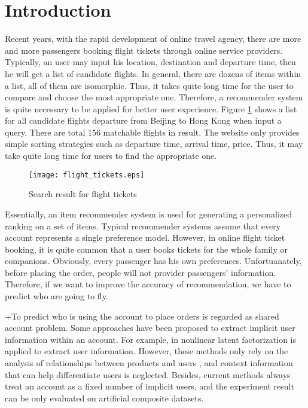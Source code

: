 \documentclass{llncs}
\begin{document}
\section{Introduction}
\label{sec:intro}
Recent years, with the rapid development of online travel agency, there are more and more passengers booking flight tickets through online service providers. Typically, an user may input his location, destination and departure time, then he will get a list of candidate flights. In general, there are dozens of items within a list, all of them are isomorphic. Thus, it takes quite long time for the user to compare and choose the most appropriate one. Therefore, a recommender system is quite necessary to be applied for better user experience. Figure \ref{fig:res} shows a list for all candidate flights departure from Beijing to Hong Kong when input a query. There are total 156 matchable flights in result. The website only provides simple sorting strategies such as departure time, arrival time, price. Thus, it may take quite long time for users to find the appropriate one.
\begin{figure}[!hbt]
\centering
\texttt{[image: flight\_tickets.eps]}
\caption{Search result for flight tickets}
\label{fig:res}
\end{figure}\par
Essentially, an item recommender system is used for generating a personalized ranking on a set of items\cite{lv:rec}. Typical recommender systems assume that every account represents a single preference model. However, in online flight ticket booking, it is quite common that a user books tickets for the whole family or companions.  Obviously, every passenger has his own preferences. Unfortuanately, before placing the order, people will not provider passengers' information.  Therefore, if we want to improve the accuracy of recommendation, we have to predict who are going to fly.  \par
 +To predict who is using the account to place orders is regarded as shared account problem. Some approaches have been proposed to extract implicit user information within an account. For example,  in \cite{kabbur:nlmf}\cite{jason:embedding} nonlinear latent factorization is applied to  extract user information. However, these methods only rely on the analysis of relationships between products and users \cite{koen:top-n}\cite{yutaka:modeling}, and context information that can help differentiate users is neglected. Besides, current methods always treat an account as a fixed number of implicit users, and the experiment result can be only evaluated on artificial composite datasets. 
\end{document}
